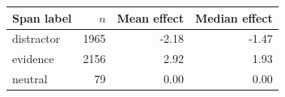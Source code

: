 \begin{tabular}{lrrr}
\toprule
Span label & $n$ & Mean effect & Median effect \\
\midrule
distractor & 1965 & -2.18 & -1.47 \\
evidence & 2156 & 2.92 & 1.93 \\
neutral & 79 & 0.00 & 0.00 \\
\bottomrule
\end{tabular}
